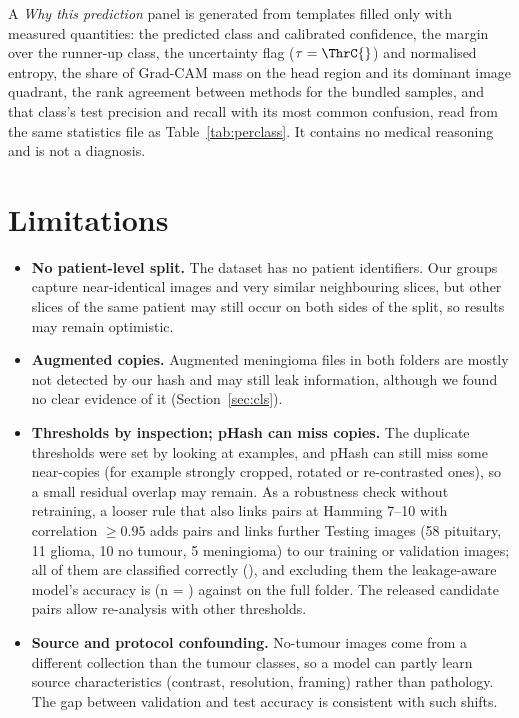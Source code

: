 \documentclass[11pt,a4paper]{article}
\begin{document}
A \emph{Why this prediction} panel is generated from templates filled only with measured quantities: the predicted class and calibrated confidence, the margin over the runner-up class, the uncertainty flag ($\tau=\ThrC{}$) and normalised entropy, the share of Grad-CAM mass on the head region and its dominant image quadrant, the rank agreement between methods for the bundled samples, and that class's test precision and recall with its most common confusion, read from the same statistics file as Table~\ref{tab:perclass}. It contains no medical reasoning and is not a diagnosis.

\section{Limitations}\label{sec:lim}
\begin{itemize}
\item \textbf{No patient-level split.} The dataset has no patient identifiers. Our groups capture near-identical images and very similar neighbouring slices, but other slices of the same patient may still occur on both sides of the split, so results may remain optimistic.
\item \textbf{Augmented copies.} Augmented meningioma files in both folders are mostly not detected by our hash and may still leak information, although we found no clear evidence of it (Section~\ref{sec:cls}).
\item \textbf{Thresholds by inspection; pHash can miss copies.} The duplicate thresholds were set by looking at examples, and pHash can still miss some near-copies (for example strongly cropped, rotated or re-contrasted ones), so a small residual overlap may remain. As a robustness check without retraining, a looser rule that also links pairs at Hamming 7--10 with correlation $\ge 0.95$ adds \SensExtraPairs{} pairs and links \SensExtraTest{} further Testing images (58 pituitary, 11 glioma, 10 no tumour, 5 meningioma) to our training or validation images; all of them are classified correctly (\SensAccOnExtra{}), and excluding them the leakage-aware model's accuracy is \SensAccExcl{} (n = \SensNExcl{}) against \AccCFull{} on the full folder. The released candidate pairs allow re-analysis with other thresholds.
\item \textbf{Source and protocol confounding.} No-tumour images come from a different collection than the tumour classes, so a model can partly learn source characteristics (contrast, resolution, framing) rather than pathology. The gap between validation and test accuracy is consistent with such shifts.

\end{itemize}
\end{document}
